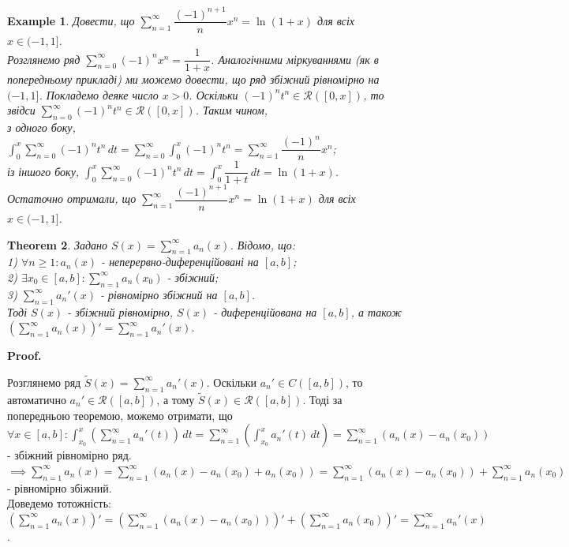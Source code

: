 \documentclass[a4paper, 10pt]{article}
\makeatletter
\def\huge{\displaystyle}
\def\qed{$\blacksquare$}
\theoremstyle{theoremdd}
\newtheorem{theorem}{Theorem}[subsection]
\theoremstyle{theoremdd}
\theoremstyle{theoremdd}
\theoremstyle{theoremdd}
\newtheorem{example}[theorem]{Example}
\theoremstyle{theoremdd}
\theoremstyle{theoremdd}
\theoremstyle{theoremdd}
\theoremstyle{theoremdd}
\renewenvironment{proof}[1][Proof.\\]{\par
\pushQED{\hfill \qed}%
\normalfont \topsep6\p@\@plus6\p@\relax
\trivlist
\item\relax
{\bfseries
#1\@addpunct{.}}\hspace\labelsep\ignorespaces
}{%
\popQED\endtrivlist\@endpefalse
}
\makeatother
\begin{document}
\begin{example}
Довести, що $\huge\sum_{n=1}^\infty \dfrac{(-1)^{n+1}}{n}x^n = \ln (1+x)$ для всіх $x \in (-1,1]$.\\
Розглянемо ряд $\huge\sum_{n=0}^\infty (-1)^n x^n = \dfrac{1}{1+x}$. Аналогічними міркуваннями (як в попередньому прикладі) ми можемо довести, що ряд збіжний рівномірно на $(-1,1]$. Покладемо деяке число $x > 0$. Оскільки $(-1)^n t^n \in \mathcal{R}([0,x])$, то звідси $\huge\sum_{n=0}^\infty (-1)^n t^n \in \mathcal{R}([0,x])$. Таким чином,\\
з одного боку, $\huge\int_0^x \huge\sum_{n=0}^\infty (-1)^n t^n \,dt = \sum_{n=0}^\infty \int_0^x (-1)^n t^n = \sum_{n=1}^\infty \dfrac{(-1)^n}{n}x^n$;\\
із іншого боку, $\huge\int_0^x \huge\sum_{n=0}^\infty (-1)^n t^n \,dt = \int_0^x \dfrac{1}{1+t}\,dt = \ln (1+x)$.\\
Остаточно отримали, що $\huge\sum_{n=1}^\infty \dfrac{(-1)^{n+1}}{n}x^n = \ln (1+x)$ для всіх $x \in (-1,1]$.
\end{example}

\begin{theorem}
Задано $S(x) = \huge \sum_{n=1}^\infty a_n(x)$. Відомо, що:\\
1) $\forall n \geq 1: a_n(x)$ - неперервно-диференційовані на $[a,b]$;\\
2) $\exists x_0 \in [a,b]: \huge \sum_{n=1}^\infty a_n(x_0)$ - збіжний;\\
3) $\huge \sum_{n=1}^\infty a_n'(x)$ - рівномірно збіжний на $[a,b]$.\\
Тоді $S(x)$ - збіжний рівномірно, $S(x)$ - диференційована на $[a,b]$, а також $\huge \left(  \sum_{n=1}^\infty a_n(x) \right)' = \sum_{n=1}^\infty a_n'(x)$.
\end{theorem}

\begin{proof}
Розглянемо ряд $\tilde{S}(x) = \huge \sum_{n=1}^\infty a_n'(x)$. Оскільки $a_n' \in C([a,b])$, то автоматично $a_n' \in \mathcal{R}([a,b])$, а тому $\tilde{S}(x) \in \mathcal{R}([a,b])$. Тоді за попередньою теоремою, можемо отримати, що\\
$\forall x \in [a,b]: \huge \int_{x_0}^x \left( \sum_{n=1}^\infty a_n'(t) \right) \,dt = \sum_{n=1}^\infty \left( \int_{x_0}^x a_n'(t) \,dt \right) = \sum_{n=1}^\infty \left( a_n(x) - a_n(x_0) \right)$ - збіжний рівномірно ряд.\\
$\implies \huge \sum_{n=1}^\infty a_n(x) = \sum_{n=1}^\infty \left(a_n(x) - a_n(x_0) + a_n(x_0) \right) = \sum_{n=1}^\infty (a_n(x) - a_n(x_0)) + \sum_{n=1}^\infty a_n(x_0)$ - рівномірно збіжний.\\
Доведемо тотожність:\\
$ \huge \left( \sum_{n=1}^\infty a_n(x) \right)' = \left( \sum_{n=1}^\infty (a_n(x) - a_n(x_0)) \right)' + \left( \sum_{n=1}^\infty a_n(x_0) \right)' = \sum_{n=1}^\infty a_n'(x)$.
\end{proof}
\end{document}
